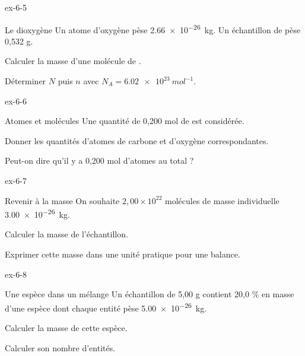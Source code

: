 \begin{blocLivre}{ex-6-5}\begin{exercice}[2]{Le dioxygène}
Un atome d’oxygène pèse \qty{2,66e-26}{kg}. Un échantillon de  pèse 0,532 g.
\begin{questions}
\item Calculer la masse d’une molécule de .
\item Déterminer $N$ puis $n$ avec $N_A=\qty{6,02e23}{mol^{-1}}$.
\end{questions}
\end{exercice}\end{blocLivre}
\begin{blocLivre}{ex-6-6}\begin{exercice}[2]{Atomes et molécules}
Une quantité de 0,200 mol de  est considérée.
\begin{questions}
\item Donner les quantités d’atomes de carbone et d’oxygène correspondantes.
\item Peut-on dire qu’il y a 0,200 mol d’atomes au total ?
\end{questions}
\end{exercice}\end{blocLivre}
\begin{blocLivre}{ex-6-7}\begin{exercice}[2]{Revenir à la masse}
On souhaite $2,00\times10^{22}$ molécules de masse individuelle \qty{3,00e-26}{kg}.
\begin{questions}
\item Calculer la masse de l’échantillon.
\item Exprimer cette masse dans une unité pratique pour une balance.
\end{questions}
\end{exercice}\end{blocLivre}
\begin{blocLivre}{ex-6-8}\begin{exercice}[2]{Une espèce dans un mélange}
Un échantillon de 5,00 g contient 20,0 \% en masse d’une espèce dont chaque entité pèse \qty{5,00e-26}{kg}.
\begin{questions}
\item Calculer la masse de cette espèce.
\item Calculer son nombre d’entités.
\end{questions}
\end{exercice}\end{blocLivre}
